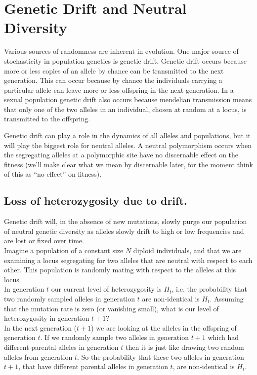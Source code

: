 
\section{Genetic Drift and Neutral Diversity}

Various sources of randomness are inherent in evolution. One major
source of stochasticity in population genetics is genetic drift. 
Genetic drift occurs because more or less copies of an allele by chance
can be transmitted to the next generation. This can occur because by
chance the individuals carrying a particular allele can 
leave more or less offspring in the next generation. In a sexual
population genetic drift also occurs because mendelian transmission
means that only one of the two alleles in an individual, chosen at
random at a locus, is transmitted to the offspring. 

Genetic drift can play a role in the dynamics of all alleles and
populations, but it will play the biggest role for neutral alleles. A neutral polymorphism occurs when the segregating alleles at a
polymorphic site have no discernable effect on
the fitness (we'll make clear what we mean by discernable later, for
the moment think of this as “no effect” on fitness). 


\subsection{Loss of heterozygosity due to drift.} \label{LossofHet} 

Genetic drift will, in the absence of new mutations, slowly purge our
population of neutral genetic diversity as alleles slowly drift to high or low
frequencies and are lost or fixed over time. \\

Imagine a population of a constant size $N$ diploid individuals, and
that we are examining a locus segregating for two alleles that are
neutral with respect to each other.  This population is randomly
mating with respect to the alleles at this locus.\\

In generation $t$ our current level of heterozygosity is $H_t$,
i.e. the probability that two randomly sampled alleles in generation
$t$ are non-identical is $H_t$. Assuming that the mutation rate is
zero (or vanishing small), what is our level of heterozygosity in
generation $t+1$?\\

In the next generation ($t+1$) we are looking at the alleles in the
offspring of generation $t$. If we randomly sample two alleles in generation
$t+1$ which had different parental alleles in generation $t$ then it
is just like drawing two random alleles from generation $t$. So the
probability that these two alleles in generation $t+1$, that have
different parental alleles in generation $t$, are non-identical is
$H_t$. \\

